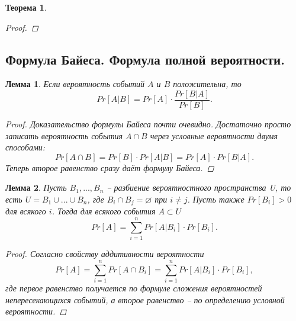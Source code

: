 \documentclass{article}
\newtheorem{theorem}{Теорема}
\newtheorem{lemma}{Лемма}
\begin{document}
\begin{theorem}
\begin{proof}
\end{proof}
\end{theorem}







\subsection{Формула Байеса. Формула полной вероятности.}
\begin{lemma}
 Если вероятность событий $A$ и $B$ положительна, то
\[
Pr[A | B] = Pr[A] \cdot \frac{Pr[B | A]}{Pr[B]}.
\]
\begin{proof}
Доказательство формулы Байеса почти очевидно. Достаточно просто записать вероятность события $A \cap B$ через условные вероятности двумя способами:
\[
Pr[A \cap B] = Pr[B] \cdot Pr[A | B] = Pr[A] \cdot Pr[B | A].
\]
Теперь второе равенство сразу даёт формулу Байеса.
\end{proof}
\end{lemma}
\begin{lemma}
Пусть $B_1,...,B_n$ -- разбиение вероятностного пространства U, то есть $U = B_1 \cup ... \cup B_n$, где $B_i \cap B_j = \varnothing$ при $i \neq j$. Пусть также $Pr[B_i] > 0$ для всякого $i$. Тогда для всякого события $A \subset U$
\[
Pr[A] = \sum_{i=1}^n Pr[A | B_i] \cdot Pr[B_i].
\]
\begin{proof}
Согласно свойству аддитивности вероятности
\[
Pr[A] = \sum_{i=1}^{n} Pr[A \cap B_i] = \sum_{i=1}^n Pr[A | B_i] \cdot Pr[B_i],
\]
где первое равенство получается по формуле сложения вероятностей непересекающихся событий, а второе равенство -- по определению условной вероятности.
\end{proof}
\end{lemma}
\end{document}
